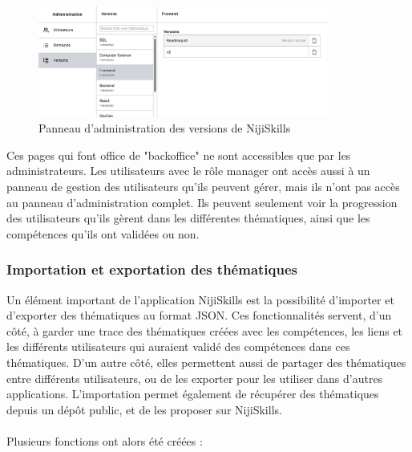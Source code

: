 \documentclass[12pt]{article}
\begin{document}
\begin{figure}[H]
    \centering
    \includegraphics[width=0.85\textwidth]{img/admin-version.png}
    \caption{Panneau d'administration des versions de NijiSkills}
\end{figure}
Ces pages qui font office de "backoffice" ne sont accessibles que par les administrateurs. Les utilisateurs avec le rôle manager ont accès aussi à un panneau de gestion des utilisateurs qu'ils peuvent gérer, mais ils n'ont pas accès au panneau d'administration complet. Ils peuvent seulement voir la progression des utilisateurs qu'ils gèrent dans les différentes thématiques, ainsi que les compétences qu'ils ont validées ou non.

\subsubsection{Importation et exportation des thématiques}
Un élément important de l'application NijiSkills est la possibilité d'importer et d'exporter des thématiques au format JSON. Ces fonctionnalités servent, d'un côté, à garder une trace des thématiques créées avec les compétences, les liens et les différents utilisateurs qui auraient validé des compétences dans ces thématiques. D'un autre côté, elles permettent aussi de partager des thématiques entre différents utilisateurs, ou de les exporter pour les utiliser dans d'autres applications. L'importation permet également de récupérer des thématiques depuis un dépôt public, et de les proposer sur NijiSkills.
\\\\
Plusieurs fonctions ont alors été créées :
\end{document}
